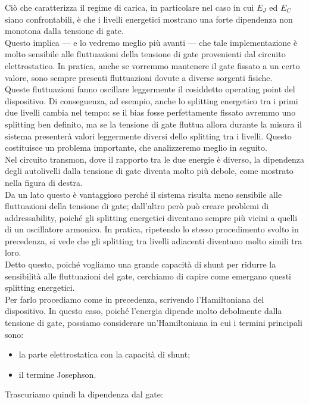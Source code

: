 Ciò che caratterizza il regime di carica, in particolare nel caso in cui $E_J$ ed $E_C$ siano confrontabili, è che i livelli energetici mostrano una forte dipendenza non monotona dalla tensione di gate.\\
Questo implica — e lo vedremo meglio più avanti — che tale implementazione è molto sensibile alle fluttuazioni della tensione di gate provenienti dal circuito elettrostatico. In pratica, anche se vorremmo mantenere il gate fissato a un certo valore, sono sempre presenti fluttuazioni dovute a diverse sorgenti fisiche.\\
Queste fluttuazioni fanno oscillare leggermente il cosiddetto operating point del dispositivo. Di conseguenza, ad esempio, anche lo splitting energetico tra i primi due livelli cambia nel tempo: se il bias fosse perfettamente fissato avremmo uno splitting ben definito, ma se la tensione di gate fluttua allora durante la misura il sistema presenterà valori leggermente diversi dello splitting tra i livelli. Questo costituisce un problema importante, che analizzeremo meglio in seguito.\\
Nel circuito transmon, dove il rapporto tra le due energie è diverso, la dipendenza degli autolivelli dalla tensione di gate diventa molto più debole, come mostrato nella figura di destra.\\
Da un lato questo è vantaggioso perché il sistema risulta meno sensibile alle fluttuazioni della tensione di gate; dall'altro però può creare problemi di addressability, poiché gli splitting energetici diventano sempre più vicini a quelli di un oscillatore armonico. In pratica, ripetendo lo stesso procedimento svolto in precedenza, si vede che gli splitting tra livelli adiacenti diventano molto simili tra loro.\\
Detto questo, poiché vogliamo una grande capacità di shunt per ridurre la sensibilità alle fluttuazioni del gate, cerchiamo di capire come emergano questi splitting energetici.\\
Per farlo procediamo come in precedenza, scrivendo l'Hamiltoniana del dispositivo. In questo caso, poiché l'energia dipende molto debolmente dalla tensione di gate, possiamo considerare un'Hamiltoniana in cui i termini principali sono:
\begin{itemize}[leftmargin=0.5cm]
    \item la parte elettrostatica con la capacità di shunt;
    \item il termine Josephson.
\end{itemize}
Trascuriamo quindi la dipendenza dal gate:
